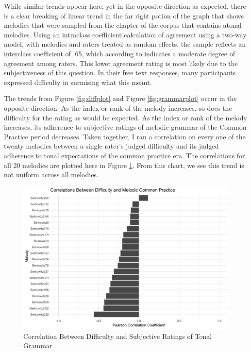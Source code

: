 \documentclass[12pt,]{book}
\begin{document}
While similar trends appear here, yet in the opposite direction as expected, there is a clear breaking of linear trend in the far right potion of the graph that shows melodies that were sampled from the chapter of the corpus that contains atonal melodies.
Using an intraclass coefficient calculation of agreement using a two-way model, with melodies and raters treated as random effects, the sample reflects an interclass coefficient of .65, which according to \citet{kooGuidelineSelectingReporting2016} indicates a moderate degree of agreement among raters.
This lower agreement rating is most likely due to the subjectiveness of this question.
In their free text responses, many participants expressed difficulty in surmising what this meant.

The trends from Figure \ref{fig:diffplot} and Figure \ref{fig:grammarplot} occur in the opposite direction.
As the index or rank of the melody increases, so does the difficulty for the rating as would be expected.
As the index or rank of the melody increases, its adherence to subjective ratings of melodic grammar of the Common Practice period decreases.
Taken together, I ran a correlation on every one of the twenty melodies between a single rater's judged difficulty and its judged adherence to tonal expectations of the common practice era.
The correlations for all 20 melodies are plotted here in Figure \ref{fig:gramcor}.
From this chart, we see this trend is not uniform across all melodies.

\begin{figure}

{\centering \includegraphics[width=1\linewidth]{img/grammar_difficulty_correlation_plot} 

}

\caption{Correlation Between Difficulty and Subjective Ratings of Tonal Grammar}\label{fig:gramcor}
\end{figure}
\end{document}
